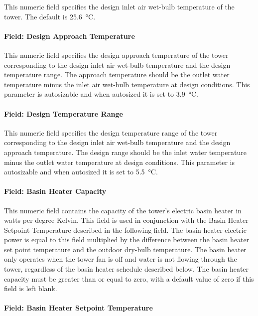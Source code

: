 This numeric field specifies the design inlet air wet-bulb temperature of the tower. The default is \SI{25.6}{\celsius}.

\paragraph{Field: Design Approach Temperature}\label{field-design-approach-temperature-2}

This numeric field specifies the design approach temperature of the tower corresponding to the design inlet air wet-bulb temperature and the design temperature range.
The approach temperature should be the outlet water temperature minus the inlet air wet-bulb temperature at design conditions.
This parameter is autosizable and when autosized it is set to \SI{3.9}{\celsius}.

\paragraph{Field: Design Temperature Range}\label{field-design-temperature-range-2}

This numeric field specifies the design temperature range of the tower corresponding to the design inlet air wet-bulb temperature and the design approach temperature.
The design range  should be the inlet water temperature minus the outlet water temperature at design conditions.
This parameter is autosizable and when autosized it is set to \SI{5.5}{\celsius}.

\paragraph{Field: Basin Heater Capacity}\label{field-basin-heater-capacity-2}

This numeric field contains the capacity of the tower's electric basin heater in watts per degree Kelvin. This field is used in conjunction with the Basin Heater Setpoint Temperature described in the following field. The basin heater electric power is equal to this field multiplied by the difference between the basin heater set point temperature and the outdoor dry-bulb temperature. The basin heater only operates when the tower fan is off and water is not flowing through the tower, regardless of the basin heater schedule described below. The basin heater capacity must be greater than or equal to zero, with a default value of zero if this field is left blank.

\paragraph{Field: Basin Heater Setpoint Temperature}\label{field-basin-heater-setpoint-temperature-2}


